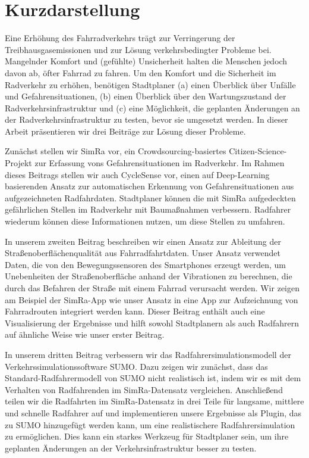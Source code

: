 \newpage
{}
\section*{Kurzdarstellung}
Eine Erhöhung des Fahrradverkehrs trägt zur Verringerung der Treibhausgasemissionen und zur Lösung verkehrsbedingter Probleme bei.
Mangelnder Komfort und (gefühlte) Unsicherheit halten die Menschen jedoch davon ab, öfter Fahrrad zu fahren.
Um den Komfort und die Sicherheit im Radverkehr zu erhöhen, benötigen Stadtplaner (a) einen Überblick über Unfälle und Gefahrensituationen, (b) einen Überblick über den Wartungszustand der Radverkehrsinfrastruktur und (c) eine Möglichkeit, die geplanten Änderungen an der Radverkehrsinfrastruktur zu testen, bevor sie umgesetzt werden.
In dieser Arbeit präsentieren wir drei Beiträge zur Lösung dieser Probleme.

Zunächst stellen wir SimRa vor, ein Crowdsourcing-basiertes Citizen-Science-Projekt zur Erfassung vons Gefahrensituationen im Radverkehr.
Im Rahmen dieses Beitrags stellen wir auch CycleSense vor, einen auf Deep-Learning basierenden Ansatz zur automatischen Erkennung von Gefahrensituationen aus aufgezeichneten Radfahrdaten.
Stadtplaner können die mit SimRa aufgedeckten gefährlichen Stellen im Radverkehr mit Baumaßnahmen verbessern.
Radfahrer wiederum können diese Informationen nutzen, um diese Stellen zu umfahren.

In unserem zweiten Beitrag beschreiben wir einen Ansatz zur Ableitung der Straßenoberflächenqualität aus Fahrradfahrtdaten.
Unser Ansatz verwendet Daten, die von den Bewegungssensoren des Smartphones erzeugt werden, um Unebenheiten der Straßenoberfläche anhand der Vibrationen zu berechnen, die durch das Befahren der Straße mit einem Fahrrad verursacht werden. 
Wir zeigen am Beispiel der SimRa-App wie unser Ansatz in eine App zur Aufzeichnung von Fahrradrouten integriert werden kann.
Dieser Beitrag enthält auch eine Visualisierung der Ergebnisse und hilft sowohl Stadtplanern als auch Radfahrern auf ähnliche Weise wie unser erster Beitrag.

In unserem dritten Beitrag verbessern wir das Radfahrersimulationsmodell der Verkehrssimulationssoftware SUMO.
Dazu zeigen wir zunächst, dass das Standard-Radfahrermodell von SUMO nicht realistisch ist, indem wir es mit dem Verhalten von Radfahrenden im SimRa-Datensatz vergleichen.
Anschließend teilen wir die Radfahrten im SimRa-Datensatz in drei Teile für langsame, mittlere und schnelle Radfahrer auf und implementieren unsere Ergebnisse als Plugin, das zu SUMO hinzugefügt werden kann, um eine realistischere Radfahrersimulation zu ermöglichen.
Dies kann ein starkes Werkzeug für Stadtplaner sein, um ihre geplanten Änderungen an der Verkehrsinfrastruktur besser zu testen. 